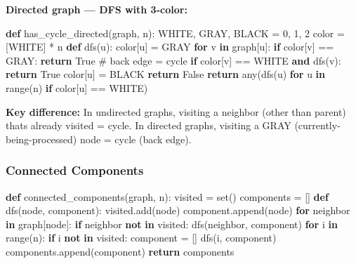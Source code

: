 \documentclass[11pt]{article}
\newenvironment{Shaded}{\begin{snugshade}}{\end{snugshade}}
\newcommand{\BuiltInTok}[1]{\textcolor[rgb]{0.50,0.55,0.55}{#1}}
\newcommand{\CommentTok}[1]{\textcolor[rgb]{0.48,0.49,0.49}{#1}}
\newcommand{\ControlFlowTok}[1]{\textcolor[rgb]{0.99,0.74,0.29}{\textbf{#1}}}
\newcommand{\DecValTok}[1]{\textcolor[rgb]{0.96,0.45,0.00}{#1}}
\newcommand{\KeywordTok}[1]{\textcolor[rgb]{0.81,0.81,0.76}{\textbf{#1}}}
\newcommand{\NormalTok}[1]{\textcolor[rgb]{0.81,0.81,0.76}{#1}}
\newcommand{\OperatorTok}[1]{\textcolor[rgb]{0.81,0.81,0.76}{#1}}
\newcommand{\VariableTok}[1]{\textcolor[rgb]{0.15,0.68,0.68}{#1}}
\begin{document}
\textbf{Directed graph --- DFS with 3-color:}


\begin{Shaded}
\begin{Highlighting}[]
\KeywordTok{def}\NormalTok{ has\_cycle\_directed(graph, n):}
\NormalTok{    WHITE, GRAY, BLACK }\OperatorTok{=} \DecValTok{0}\NormalTok{, }\DecValTok{1}\NormalTok{, }\DecValTok{2}
\NormalTok{    color }\OperatorTok{=}\NormalTok{ [WHITE] }\OperatorTok{*}\NormalTok{ n}
    \KeywordTok{def}\NormalTok{ dfs(u):}
\NormalTok{        color[u] }\OperatorTok{=}\NormalTok{ GRAY}
        \ControlFlowTok{for}\NormalTok{ v }\KeywordTok{in}\NormalTok{ graph[u]:}
            \ControlFlowTok{if}\NormalTok{ color[v] }\OperatorTok{==}\NormalTok{ GRAY: }\ControlFlowTok{return} \VariableTok{True}    \CommentTok{\# back edge = cycle}
            \ControlFlowTok{if}\NormalTok{ color[v] }\OperatorTok{==}\NormalTok{ WHITE }\KeywordTok{and}\NormalTok{ dfs(v): }\ControlFlowTok{return} \VariableTok{True}
\NormalTok{        color[u] }\OperatorTok{=}\NormalTok{ BLACK}
        \ControlFlowTok{return} \VariableTok{False}
    \ControlFlowTok{return} \BuiltInTok{any}\NormalTok{(dfs(u) }\ControlFlowTok{for}\NormalTok{ u }\KeywordTok{in} \BuiltInTok{range}\NormalTok{(n) }\ControlFlowTok{if}\NormalTok{ color[u] }\OperatorTok{==}\NormalTok{ WHITE)}
\end{Highlighting}
\end{Shaded}

\textbf{Key difference:} In undirected graphs, visiting a neighbor (other than parent) that\textquotesingle s already visited = cycle. In directed graphs, visiting a GRAY (currently-being-processed) node = cycle (back edge).

\subsubsection{Connected Components}\label{connected-components}


\begin{Shaded}
\begin{Highlighting}[]
\KeywordTok{def}\NormalTok{ connected\_components(graph, n):}
\NormalTok{    visited }\OperatorTok{=} \BuiltInTok{set}\NormalTok{()}
\NormalTok{    components }\OperatorTok{=}\NormalTok{ []}
    \KeywordTok{def}\NormalTok{ dfs(node, component):}
\NormalTok{        visited.add(node)}
\NormalTok{        component.append(node)}
        \ControlFlowTok{for}\NormalTok{ neighbor }\KeywordTok{in}\NormalTok{ graph[node]:}
            \ControlFlowTok{if}\NormalTok{ neighbor }\KeywordTok{not} \KeywordTok{in}\NormalTok{ visited:}
\NormalTok{                dfs(neighbor, component)}
    \ControlFlowTok{for}\NormalTok{ i }\KeywordTok{in} \BuiltInTok{range}\NormalTok{(n):}
        \ControlFlowTok{if}\NormalTok{ i }\KeywordTok{not} \KeywordTok{in}\NormalTok{ visited:}
\NormalTok{            component }\OperatorTok{=}\NormalTok{ []}
\NormalTok{            dfs(i, component)}
\NormalTok{            components.append(component)}
    \ControlFlowTok{return}\NormalTok{ components}
\end{Highlighting}
\end{Shaded}
\end{document}
